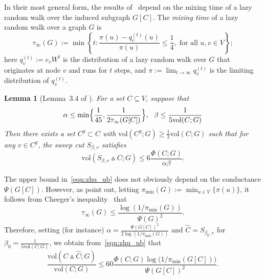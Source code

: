 \documentclass[11pt,twoside]{article}
\newtheorem{lemma}{Lemma}
\theoremstyle{definition}
\newcommand{\set}[1]{\left\{#1\right\}}
\newcommand{\1}{\mathbf{1}}
\newcommand{\wh}[1]{\widehat{#1}}
\newcommand{\vol}{\mathrm{vol}}
\begin{document}
In their most general form, the results of~\citet{zhu2013} depend on the mixing time of a lazy random walk over the induced subgraph $G[C]$. The \emph{mixing time} of a lazy random walk over a graph $G$ is
\begin{equation}
\label{eqn:mixing_time}
\tau_{\infty}(G) := \min\set{ t: \frac{{\pi}(u) - {q}_{v}^{(t)}(u)}
	{{\pi}(u)} \leq \frac{1}{4}, \; \text{for all $u,v \in V$}};
\end{equation}
here $q_v^{(t)} := e_v W^t$ is the distribution of a lazy random walk over $G$ that originates at node $v$ and runs for $t$ steps, and $\pi := \lim_{t \to \infty} q_v^{(t)}$ is the limiting distribution of $q_v^{(t)}$.
\begin{lemma}[Lemma~3.4 of \cite{zhu2013}]
	\label{lem:zhu}
	For a set $C \subseteq V$, suppose that
	\begin{equation}
	\label{eqn:zhu_condition}
	\alpha \leq \min\Bigl\{\frac{1}{45}, \frac{1}{2\tau_{\infty}(G[C])}\Bigr\},~~ \beta \leq \frac{1}{5\vol(C;G)}
	\end{equation}
	Then there exists a set $C^g \subset C$ with $\vol(C^g;G) \geq \frac{1}{2}\vol(C;G)$ such that for any $v \in C^g$, the sweep cut $S_{\beta,v}$ satisfies
	\begin{equation}
	\label{eqn:zhu_ub}
	\vol(S_{\beta,v} \vartriangle C;G) \leq 6\frac{\Phi(C;G)}{\alpha \beta}.
	\end{equation}
\end{lemma}
The upper bound in~\eqref{eqn:zhu_ub} does not obviously depend on the conductance $\Psi(G[C])$. However, as \cite{zhu2013} point out, letting $\pi_{\min}(G) := \min_{u \in V}\{\pi(u)\}$, it follows from Cheeger's inequality~\citep{chung1997} that 
\begin{equation}
\label{eqn:mixing_time_cheeger}
\tau_{\infty}(G) \leq \frac{\log(1/\pi_{\min}(G))}{\Psi(G)^2}.
\end{equation}
Therefore, setting (for instance) $\alpha = \frac{\Psi(G[C])^2}{2\log(1/\pi_{\min}(G))}$ and $\wh{C} = S_{\beta_0,v}$ for $\beta_0 = \frac{1}{5 \vol(C;G)}$, we obtain from~\eqref{eqn:zhu_ub} that 
\begin{equation}
\label{eqn:zhu_ub2}
\frac{\vol(C \vartriangle \wh{C};G)}{\vol(C; G)} \leq 60\frac{\Phi(C;G) \log\bigl( 1/\pi_{\min}(G[C])\bigr)}{\Psi(G[C])^2}.
\end{equation}
\end{document}

